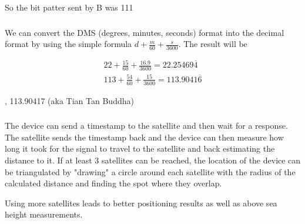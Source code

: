 \documentclass[12pt]{article}
\newcommand{\multipartexercise}{\addtocounter{subsection}{1}\setcounter{subsubsection}{0}}
\newcommand{\exercisepart}{\subsubsection{}}
\begin{document}
\bigskip
\noindent
So the bit patter sent by B was 111

\multipartexercise
\exercisepart
We can convert the DMS (degrees, minutes, seconds) format into the decimal format by using the simple formula $d + \frac{m}{60} + \frac{s}{3600}$. The result will be

\begin{align*}
22 + \frac{15}{60} + \frac{16.9}{3600} = 22.25469\overline{4}\\
113 + \frac{54}{60} + \frac{15}{3600} = 113.9041\overline{6}
\end{align*}

\bigskip
{}, 113.90417 (aka Tian Tan Buddha)

\exercisepart
The device can send a timestamp to the satellite and then wait for a response. The satellite sends the timestamp back and the device can then measure how long it took for the signal to travel to the satellite and back estimating the distance to it. If at least 3 satellites can be reached, the location of the device can be triangulated by "drawing" a circle around each satellite with the radius of the calculated distance and finding the spot where they overlap.

Using more satellites leads to better positioning results as well as above sea height measurements.
\end{document}
